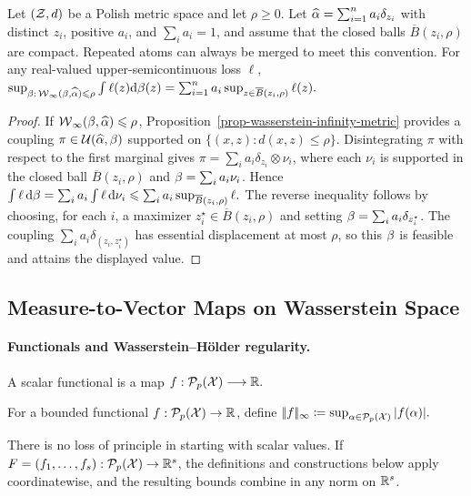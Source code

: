 \begin{prop}\label{prop-wasserstein-infty-dro}
Let $(\mathcal{Z},d)$ be a Polish metric space and let $\rho\geq0$. Let $\widehat{\alpha}=\sum_{i=1}^n a_i\delta_{z_i}$ with distinct $z_i$, positive $a_i$, and $\sum_i a_i=1$, and assume that the closed balls $\overline B(z_i,\rho)$ are compact. Repeated atoms can always be merged to meet this convention. For any real-valued upper-semicontinuous loss $\ell$,
\(\sup_{\beta:\,\operatorname{\mathcal{W}}_\infty(\beta,\widehat{\alpha})\leqslant\rho} \int \ell(z)\mathrm{d}\beta(z) = \sum_{i=1}^n a_i\sup_{z\in\overline B(z_i,\rho)}\ell(z).\)
\end{prop}
\begin{proof}
If $\operatorname{\mathcal{W}}_\infty(\beta,\widehat{\alpha})\leqslant\rho$, Proposition~\ref{prop-wasserstein-infinity-metric} provides a coupling $\pi\in\mathcal{U}(\widehat{\alpha},\beta)$ supported on $\{(x,z):d(x,z)\leq\rho\}$.
Disintegrating $\pi$ with respect to the first marginal gives $\pi=\sum_i a_i\delta_{z_i}\otimes\nu_i$, where each $\nu_i$ is supported in the closed ball $\overline B(z_i,\rho)$ and $\beta=\sum_i a_i\nu_i$. Hence
\(\int\ell\,\mathrm{d}\beta = \sum_i a_i\int\ell\,\mathrm{d}\nu_i \leqslant \sum_i a_i\sup_{\overline B(z_i,\rho)}\ell.\)
The reverse inequality follows by choosing, for each $i$, a maximizer $z_i^\star\in\overline B(z_i,\rho)$ and setting $\beta=\sum_i a_i\delta_{z_i^\star}$. The coupling $\sum_i a_i\delta_{(z_i,z_i^\star)}$ has essential displacement at most $\rho$, so this $\beta$ is feasible and attains the displayed value.
\end{proof}
\subsection{Measure-to-Vector Maps on Wasserstein Space}\label{sec-measure-to-vector-maps}
\paragraph{Functionals and Wasserstein--H\"older regularity.}
A scalar functional is a map
\(f:\mathcal{P}_p(\mathcal{X})\longrightarrow\mathbb{R}.\)
\begin{defn}\label{def-uniform-norm-functionals}
For a bounded functional \(f:\mathcal{P}_p(\mathcal{X})\to\mathbb{R}\), define
\(|\!| f |\!|_\infty \coloneqq \sup_{\alpha\in\mathcal{P}_p(\mathcal{X})}|f(\alpha)|.\)
\end{defn}
There is no loss of principle in starting with scalar values. If \(F=(f_1,\ldots,f_s):\mathcal{P}_p(\mathcal{X})\to\mathbb{R}^s\), the definitions and constructions below apply coordinatewise, and the resulting bounds combine in any norm on \(\mathbb{R}^s\).

